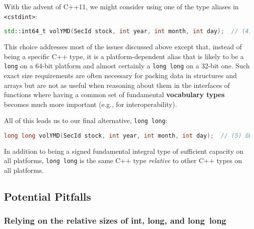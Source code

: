 With the advent of C++11, we might consider using one of the type aliases
in \texttt{<cstdint>}:

\begin{lstlisting}[language=C++]
std::int64_t volYMD(SecId stock, int year, int month, int day);  // (4) OK
\end{lstlisting}
    
\noindent This choice addresses most of the issues discussed above except that,
instead of being a specific C++ type, it is a platform-dependent alias
that is likely to be a \texttt{long} on a 64-bit platform and almost
certainly a \texttt{long}~\texttt{long} on a 32-bit one. Such exact size
requirements are often necessary for packing data in structures and
arrays but are not as useful when reasoning about them in the
interfaces of functions where having a common set of fundamental
\textbf{vocabulary types} becomes much more important (e.g., for
interoperability).

All of this leads us to our final alternative, \texttt{long}~\texttt{long}:

\begin{lstlisting}[language=C++]
long long volYMD(SecId stock, int year, int month, int day);  // (5) GOOD IDEA
\end{lstlisting}
    
\noindent In addition to being a signed fundamental integral type of sufficient
capacity on all platforms, \texttt{long}~\texttt{long} is the same C++
type \emph{relative} to other C++ types on all platforms.

\subsection[Potential Pitfalls]{Potential Pitfalls}\label{longlong-potential-pitfalls}

\subsubsection[Relying on the relative sizes of {\tt int}, {\tt long}, and {\tt long}~{\tt long}]{Relying on the relative sizes of {\SubsubsecCode int}, {\SubsubsecCode long}, and {\SubsubsecCode long}~{\SubsubsecCode long}}\label{relying-on-the-relative-sizes-of-int,-long,-and-long-long}

